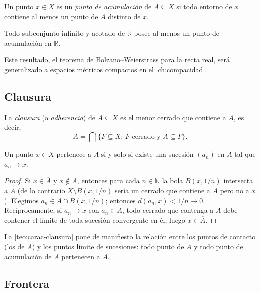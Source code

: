 \begin{definition}
\label{def:punto-acumulacion}
Un punto $x\in X$ es un \emph{punto de acumulación} de $A\subseteq X$ si todo entorno de $x$ contiene al menos un punto de $A$ distinto de $x$.
\end{definition}

\begin{theorem}
\label{teo:bolzano-weierstrass-r}
Todo subconjunto infinito y acotado de $\mathbb{R}$ posee al menos un punto de acumulación en $\mathbb{R}$.
\end{theorem}

Este resultado, el teorema de Bolzano--Weierstrass para la recta real, será generalizado a espacios métricos compactos en el \cref{ch:compacidad}.

\subsection{Clausura}

\begin{definition}
\label{def:clausura}
La \emph{clausura} (o \emph{adherencia}) de $A\subseteq X$ es el menor cerrado que contiene a $A$, es decir,
\[
  \overline{A}=\bigcap\{F\subseteq X:\,F\text{ cerrado y }A\subseteq F\}.
\]
\end{definition}

\begin{theorem}
\label{teo:carac-clausura}
Un punto $x\in X$ pertenece a $\overline{A}$ si y solo si existe una sucesión $(a_n)$ en $A$ tal que $a_n\to x$.
\end{theorem}

\begin{proof}
Si $x\in\overline{A}$ y $x\notin A$, entonces para cada $n\in\mathbb{N}$ la bola $B(x,1/n)$ intersecta a $A$ (de lo contrario $X\setminus B(x,1/n)$ sería un cerrado que contiene a $A$ pero no a $x$). Elegimos $a_n\in A\cap B(x,1/n)$; entonces $d(a_n,x)<1/n\to 0$. Recíprocamente, si $a_n\to x$ con $a_n\in A$, todo cerrado que contenga a $A$ debe contener el límite de toda sucesión convergente en él, luego $x\in\overline{A}$.
\end{proof}

La \cref{teo:carac-clausura} pone de manifiesto la relación entre los puntos de contacto (los de $\overline{A}$) y los puntos límite de sucesiones: todo punto de $A$ y todo punto de acumulación de $A$ pertenecen a $\overline{A}$.

\subsection{Frontera}

